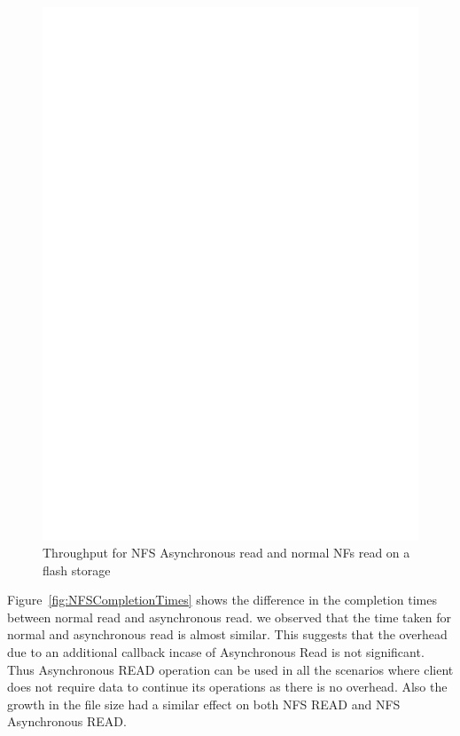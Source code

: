 \begin{figure}
\centering
\includegraphics[scale=0.6]{figures/performancesequence.eps}
\caption{Throughput for NFS Asynchronous read and normal NFs read on a flash storage}
\label{fig:performancesequence}
\end{figure}


	Figure~\ref{fig:NFSCompletionTimes} shows the  difference in the completion times between normal read and asynchronous read. we observed that the time taken for normal and asynchronous read is almost similar. This suggests that the overhead due to an additional callback incase of Asynchronous Read is not significant. Thus Asynchronous READ operation can be used in all the scenarios where client does not require data to continue its operations as there is no overhead. Also the growth in the file size had a similar effect on both NFS READ and NFS Asynchronous READ. 




